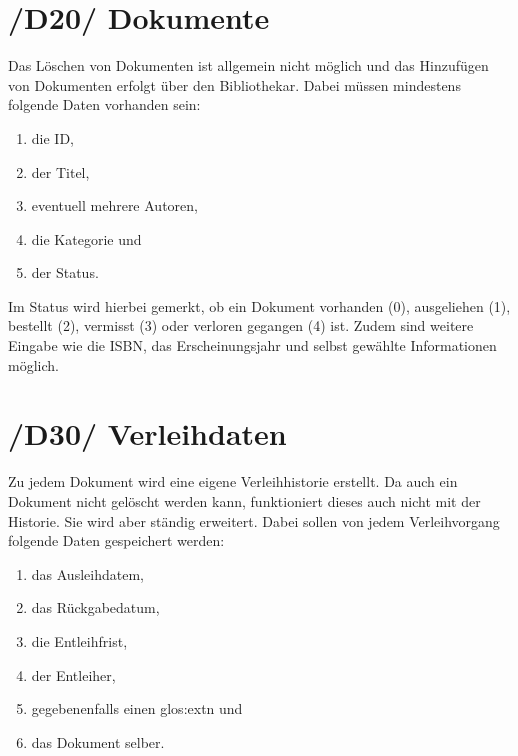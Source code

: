 \section{/D20/ Dokumente}
Das Löschen von Dokumenten ist allgemein nicht möglich und das Hinzufügen von Dokumenten erfolgt über den Bibliothekar. Dabei müssen mindestens folgende Daten vorhanden sein:
\begin{enumerate}
	\item die ID,
	\item der Titel,
	\item eventuell mehrere Autoren,
	\item die Kategorie und
	\item der Status.
\end{enumerate}
Im Status wird hierbei gemerkt, ob ein Dokument vorhanden (0), ausgeliehen (1), bestellt (2), vermisst (3) oder verloren gegangen (4) ist. 
Zudem sind weitere Eingabe wie die ISBN, das Erscheinungsjahr und selbst gewählte Informationen möglich. 

\section{/D30/ Verleihdaten}
Zu jedem Dokument wird eine eigene Verleihhistorie erstellt. Da auch ein Dokument nicht gelöscht werden kann, funktioniert dieses auch nicht mit der Historie. Sie wird aber ständig erweitert. Dabei sollen von jedem Verleihvorgang folgende Daten gespeichert werden:
\begin{enumerate}
	\item das Ausleihdatem,
	\item das Rückgabedatum,
	\item die Entleihfrist,
	\item der Entleiher,
	\item gegebenenfalls einen \gls{glos:ext}n und
	\item das Dokument selber.
\end{enumerate} 
